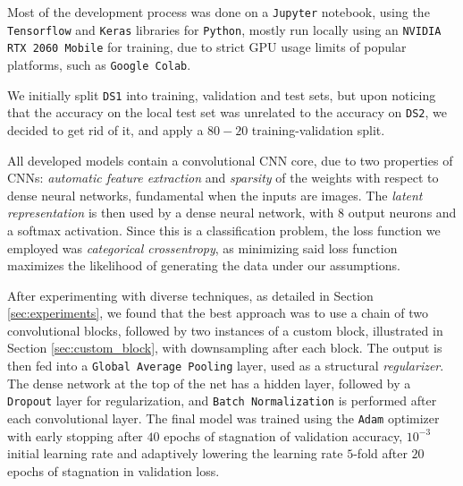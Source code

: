 \documentclass[11pt]{article}
\begin{document}
\begin{multicols}{2}


      Most of the development process was done on a \texttt{Jupyter} notebook, using the \texttt{Tensorflow}\cite{TensorFlow} and \texttt{Keras}\cite{chollet2015keras} libraries for \texttt{Python}, mostly run locally using an \texttt{NVIDIA RTX 2060 Mobile} for training, due to strict GPU usage limits of popular platforms, such as \texttt{Google Colab}.

      We initially split \texttt{DS1} into training, validation and test sets, but upon noticing that the accuracy on the local test set was unrelated to the accuracy on \texttt{DS2}, we decided to get rid of it, and apply a $80-20$ training-validation split.

      All developed models contain a convolutional CNN core, due to two properties of CNNs: \textit{automatic feature extraction} and \textit{sparsity} of the weights with respect to dense neural networks, fundamental when the inputs are images. The \textit{latent representation} is then used by a dense neural network, with 8 output neurons and a softmax activation. Since this is a classification problem, the loss function we employed was \textit{categorical crossentropy}, as minimizing said loss function maximizes the likelihood of generating the data under our assumptions\cite{shalev2014understanding}.

      After experimenting with diverse techniques, as detailed in Section \ref{sec:experiments}, we found that the best approach was to use a chain of two convolutional blocks, followed by two instances of a custom block, illustrated in Section \ref{sec:custom_block}, with downsampling after each block. The output is then fed into a \texttt{Global Average Pooling}\cite{Lin2013NetworkIN} layer, used as a structural \textit{regularizer}. The dense network at the top of the net has a hidden layer, followed by a \texttt{Dropout} layer for regularization, and \texttt{Batch Normalization}\cite{pmlr-v37-ioffe15} is performed after each convolutional layer. The final model was trained using the \texttt{Adam}\cite{Kingma2014AdamAM} optimizer with early stopping after $40$ epochs of stagnation of validation accuracy, $10^{-3}$ initial learning rate and adaptively lowering the learning rate $5$-fold after $20$ epochs of stagnation in validation loss.


\end{multicols}
\end{document}
